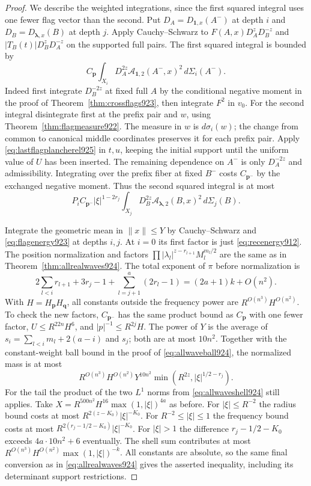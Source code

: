 \documentclass[a4paper,11pt]{article}
\theoremstyle{definition}
\theoremstyle{remark}
\numberwithin{equation}{section}
\begin{document}
\begin{proof}
We describe the weighted integrations, since the first squared
integral uses one fewer flag vector than the second. Put
\(D_A=D_{\mathbf1,x}(A^-)\) at depth \(i\) and
\(D_B=D_{\boldsymbol\lambda,x}(B)\) at depth \(j\).
Apply Cauchy--Schwarz to
\(F(A,x)D_A^z D_B^{-z}\) and
\(|T_B(t)|D_B^z D_A^{-z}\) on the supported full pairs. The
first squared integral is bounded by
\[
  C_{\mathbf p}\int_{X_i}D_A^{2z}
               \mathcal A_{\mathbf1,2}(A^-,x)^2\,d\Sigma_i(A^-).
\]
Indeed first integrate \(D_B^{-2z}\) at fixed full \(A\)
by the conditional negative moment in the proof of
Theorem~\ref{thm:crossflags923}, then integrate \(F^2\) in
\(v_0\). For the second integral disintegrate first at the
prefix pair and \(w\), using Theorem~\ref{thm:flagmeasure922}.
The measure in \(w\) is \(d\sigma_i(w)\); the change from common
to canonical middle coordinates preserves it for each prefix
pair. Apply \eqref{eq:lastflagplancherel925} in \(t,u\), keeping
the initial support until the uniform value of \(U\) has
been inserted. The remaining dependence on \(A^-\) is only
\(D_A^{-2z}\) and admissibility. Integrating over the prefix
fiber at fixed \(B^-\) costs \(C_{\mathbf p^-}\) by the exchanged
negative moment. Thus the second squared integral is at most
\[
 P_i C_{\mathbf p^-}|\xi|^{1-2r_j}\int_{X_j}
        D_B^{2z}\mathcal A_{\boldsymbol\lambda,2}(B,x)^2\,d\Sigma_j(B).
\]

Integrate the geometric mean in \(\|x\|\le Y\) by
Cauchy--Schwarz and \eqref{eq:flagenergy923} at depths \(i,j\).
At \(i=0\) its first factor is just \eqref{eq:recenergy912}.
The position normalization and factors
\(\prod|\lambda_l|^{z-r_{l+1}}M_l^{m_l/2}\) are the same as in
Theorem~\ref{thm:allrealwaves924}. The total exponent of \(\pi\)
before normalization is
\[
 2\sum_{l<i}r_{l+1}+3r_j-1+\sum_{l=j+1}^a(2r_l-1)
                 =(2a+1)k+O(n^2).
\]
With \(H=H_{\mathbf p}H_{\mathbf q}\), all constants outside
the frequency power are \(R^{O(n^3)}H^{O(n^2)}\). To check the
new factors, \(C_{\mathbf p^-}\) has the same product bound as
\(C_{\mathbf p}\) with one fewer factor, \(U\le R^{22n}H^6\),
and \(|p|^{-1}\le R^{2j}H\). The power of \(Y\) is the
average of \(s_i=\sum_{l<i}m_l+2(a-i)\) and \(s_j\);
both are at most \(10n^2\). Together with the constant-weight
ball bound in the proof of \eqref{eq:allwaveball924}, the
normalized mass is at most
\[
   R^{O(n^3)}H^{O(n^2)}Y^{10n^2}
           \min(R^{2z},|\xi|^{1/2-r_j}).
\]
For the tail the product of the two \(L^1\) norms from
\eqref{eq:allwaveshell924} still applies. Take
\(X=R^{500n^2}H^{16}\max(1,|\xi|)^{4a}\) as before. For
\(|\xi|\le R^{-2}\) the radius bound costs at most
\(R^{2(z-K_0)}|\xi|^{-K_0}\). For \(R^{-2}\le|\xi|\le1\)
the frequency bound costs at most
\(R^{2(r_j-1/2-K_0)}|\xi|^{-K_0}\). For \(|\xi|>1\) the
difference \(r_j-1/2-K_0\) exceeds \(4a\cdot10n^2+6\) eventually.
The shell sum contributes at most
\(R^{O(n^3)}H^{O(n^2)}\max(1,|\xi|)^{-k}\).
All constants are absolute, so the same final conversion as in
\eqref{eq:allrealwaves924} gives the asserted inequality,
including its determinant support restrictions.
\end{proof}
\clearpage
\end{document}
